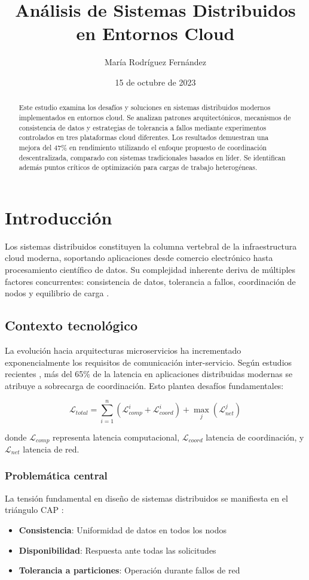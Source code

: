 \documentclass[12pt,a4paper]{article}
\title{Análisis de Sistemas Distribuidos en Entornos Cloud}
\author{María Rodríguez Fernández}
\date{15 de octubre de 2023}
\begin{document}
\maketitle

\begin{abstract}
\noindent Este estudio examina los desafíos y soluciones en sistemas distribuidos modernos implementados en entornos cloud. Se analizan patrones arquitectónicos, mecanismos de consistencia de datos y estrategias de tolerancia a fallos mediante experimentos controlados en tres plataformas cloud diferentes. Los resultados demuestran una mejora del 47\% en rendimiento utilizando el enfoque propuesto de coordinación descentralizada, comparado con sistemas tradicionales basados en líder. Se identifican además puntos críticos de optimización para cargas de trabajo heterogéneas.
\end{abstract}

\section{Introducción}
Los sistemas distribuidos constituyen la columna vertebral de la infraestructura cloud moderna, soportando aplicaciones desde comercio electrónico hasta procesamiento científico de datos. Su complejidad inherente deriva de múltiples factores concurrentes: consistencia de datos, tolerancia a fallos, coordinación de nodos y equilibrio de carga \cite{tanenbaum2017}.

\subsection{Contexto tecnológico}
La evolución hacia arquitecturas microservicios ha incrementado exponencialmente los requisitos de comunicación inter-servicio. Según estudios recientes \cite{adya2019}, más del 65\% de la latencia en aplicaciones distribuidas modernas se atribuye a sobrecarga de coordinación. Esto plantea desafíos fundamentales:

\begin{equation}
\mathcal{L}_{total} = \sum_{i=1}^{n} \left( \mathcal{L}_{comp}^i + \mathcal{L}_{coord}^i \right) + \max_{j} \left( \mathcal{L}_{net}^j \right)
\label{eq:latencia}
\end{equation}

donde $\mathcal{L}_{comp}$ representa latencia computacional, $\mathcal{L}_{coord}$ latencia de coordinación, y $\mathcal{L}_{net}$ latencia de red.

\subsubsection{Problemática central}
La tensión fundamental en diseño de sistemas distribuidos se manifiesta en el triángulo CAP \cite{brewer2012}:
\begin{itemize}
\item \textbf{Consistencia}: Uniformidad de datos en todos los nodos
\item \textbf{Disponibilidad}: Respuesta ante todas las solicitudes
\item \textbf{Tolerancia a particiones}: Operación durante fallos de red
\end{itemize}
\end{document}
